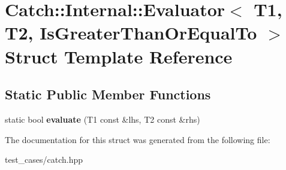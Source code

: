 \hypertarget{structCatch_1_1Internal_1_1Evaluator_3_01T1_00_01T2_00_01IsGreaterThanOrEqualTo_01_4}{}\section{Catch\+:\+:Internal\+:\+:Evaluator$<$ T1, T2, Is\+Greater\+Than\+Or\+Equal\+To $>$ Struct Template Reference}
\label{structCatch_1_1Internal_1_1Evaluator_3_01T1_00_01T2_00_01IsGreaterThanOrEqualTo_01_4}
\subsection*{Static Public Member Functions}
\begin{DoxyCompactItemize}
\item 
\mbox{\label{structCatch_1_1Internal_1_1Evaluator_3_01T1_00_01T2_00_01IsGreaterThanOrEqualTo_01_4_a5ba107c6da4292b6492a0e5e906f9484}} 
static bool {\bfseries evaluate} (T1 const \&lhs, T2 const \&rhs)
\end{DoxyCompactItemize}


The documentation for this struct was generated from the following file\+:\begin{DoxyCompactItemize}
\item 
test\+\_\+cases/catch.\+hpp\end{DoxyCompactItemize}
